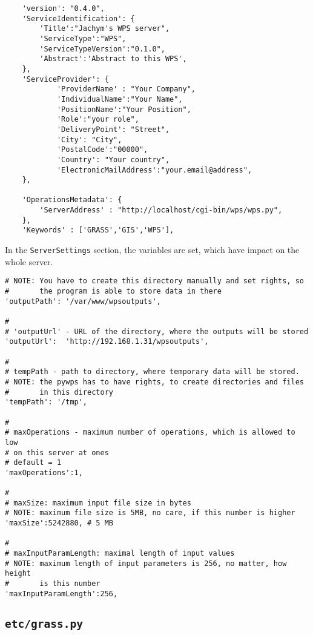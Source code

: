 \documentclass[a4paper,11pt]{article}
\begin{document}
    \begin{verbatim}
    'version': "0.4.0",
    'ServiceIdentification': {
        'Title':"Jachym's WPS server",
        'ServiceType':"WPS",
        'ServiceTypeVersion':"0.1.0",
        'Abstract':'Abstract to this WPS',
    },
    'ServiceProvider': {
            'ProviderName' : "Your Company",
            'IndividualName':"Your Name",
            'PositionName':"Your Position",
            'Role':"your role",
            'DeliveryPoint': "Street",
            'City': "City",
            'PostalCode':"00000",
            'Country': "Your country",
            'ElectronicMailAddress':"your.email@address",
    },

    'OperationsMetadata': {
        'ServerAddress' : "http://localhost/cgi-bin/wps/wps.py",
    },
    'Keywords' : ['GRASS','GIS','WPS'],
    \end{verbatim}

     
    In the \texttt{ServerSettings} section, the variables are set, which have impact on
    the whole server.
     

    \begin{verbatim}
# NOTE: You have to create this directory manually and set rights, so
#       the program is able to store data in there 
'outputPath': '/var/www/wpsoutputs',

#
# 'outputUrl' - URL of the directory, where the outputs will be stored
'outputUrl':  'http://192.168.1.31/wpsoutputs',

#
# tempPath - path to directory, where temporary data will be stored.
# NOTE: the pywps has to have rights, to create directories and files
#       in this directory
'tempPath': '/tmp',

#
# maxOperations - maximum number of operations, which is allowed to low
# on this server at ones 
# default = 1
'maxOperations':1,

#
# maxSize: maximum input file size in bytes
# NOTE: maximum file size is 5MB, no care, if this number is higher
'maxSize':5242880, # 5 MB

#
# maxInputParamLength: maximal length of input values
# NOTE: maximum length of input parameters is 256, no matter, how height
#       is this number
'maxInputParamLength':256,
\end{verbatim}


    \subsection{\texttt{etc/grass.py}}
     
\end{document}
